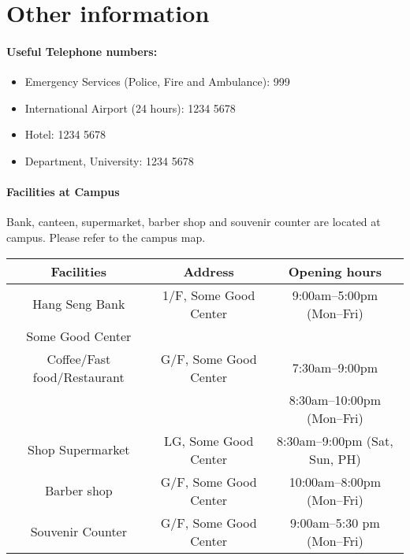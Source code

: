 \documentclass[openany,parskip=half,12pt,a4paper,table]{scrbook}
\begin{document}
{\section{Other information}

\paragraph{Useful Telephone numbers:}
\begin{itemize}
	\item Emergency Services (Police, Fire and Ambulance): 999
	\item International Airport (24 hours): 1234 5678
	\item Hotel: 1234 5678
	\item Department, University: 1234 5678
\end{itemize}

\paragraph{Facilities at Campus}
Bank, canteen, supermarket, barber shop and souvenir counter are located at campus. Please refer to the campus map.
\begin{table}[H]
	\centering
	\begin{tabular}{|c|c|c|}
		\hline
		\textbf{Facilities} & \textbf{Address} & \textbf{Opening hours} \\\hline
		Hang Seng Bank & 1/F, Some Good Center & 9:00am--5:00pm (Mon--Fri) \\\hline
		
	 	\rowcolor{\tbc} Some Good Center &   &  \\ 	
		 \rowcolor{\tbc} Coffee/Fast food/Restaurant & \multirow{-2}{*}{G/F, Some Good Center} & \multirow{-2}{*}{ 7:30am--9:00pm} \\\hline
		
		&  & 8:30am--10:00pm (Mon--Fri) \\
		\multirow{-2}{*}{Shop Supermarket} & \multirow{-2}{*}{LG, Some Good Center} & 8:30am--9:00pm (Sat, Sun, PH) \\\hline
		\rowcolor{\tbc} Barber shop & G/F, Some Good Center & 10:00am--8:00pm (Mon--Fri) \\\hline
		Souvenir Counter &	G/F, Some Good Center & 9:00am--5:30 pm (Mon--Fri) \\\hline
	\end{tabular}
\end{table}

\newpage

}
\end{document}
